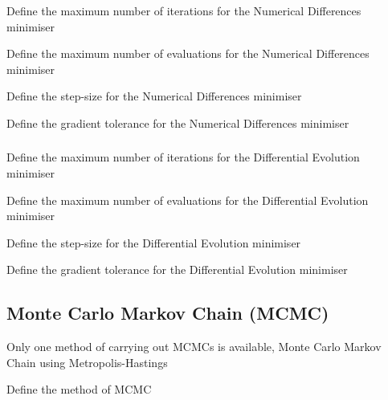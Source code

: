  {Define the maximum number of iterations for the Numerical Differences minimiser}

 {Define the maximum number of evaluations for the Numerical Differences minimiser}

 {Define the step-size for the Numerical Differences minimiser}

 {Define the gradient tolerance for the Numerical Differences minimiser}

\subsubsection[Differential evolution minimiser]{} 

 {Define the maximum number of iterations for the Differential Evolution minimiser}

 {Define the maximum number of evaluations for the Differential Evolution minimiser}

 {Define the step-size for the Differential Evolution minimiser}

 {Define the gradient tolerance for the Differential Evolution minimiser}

\subsection{Monte Carlo Markov Chain (MCMC)}

Only one method of carrying out MCMCs is available, Monte Carlo Markov Chain using Metropolis-Hastings


 {Define the method of MCMC}

